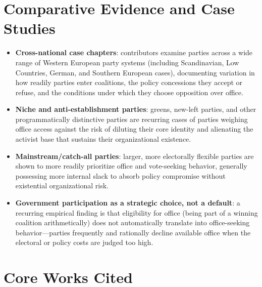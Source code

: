 \documentclass[12pt]{article}
\begin{document}
\section{Comparative Evidence and Case Studies}

\begin{itemize}[leftmargin=*, itemsep=4pt]
    \item \textbf{Cross-national case chapters}: contributors examine parties across a wide range of Western European party systems (including Scandinavian, Low Countries, German, and Southern European cases), documenting variation in how readily parties enter coalitions, the policy concessions they accept or refuse, and the conditions under which they choose opposition over office.
    \item \textbf{Niche and anti-establishment parties}: greens, new-left parties, and other programmatically distinctive parties are recurring cases of parties weighing office access against the risk of diluting their core identity and alienating the activist base that sustains their organizational existence.
    \item \textbf{Mainstream/catch-all parties}: larger, more electorally flexible parties are shown to more readily prioritize office and vote-seeking behavior, generally possessing more internal slack to absorb policy compromise without existential organizational risk.
    \item \textbf{Government participation as a strategic choice, not a default}: a recurring empirical finding is that eligibility for office (being part of a winning coalition arithmetically) does not automatically translate into office-seeking behavior---parties frequently and rationally decline available office when the electoral or policy costs are judged too high.
\end{itemize}

\section{Core Works Cited}
\end{document}

